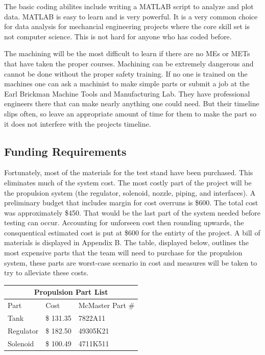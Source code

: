 \documentclass[conference]{IEEEtran} %
\begin{document}
The basic coding abilites include writing a MATLAB script to analyze and plot data. MATLAB is easy to learn and is very powerful. It is a very common choice for data analysis for mechancial engineering
projects where the core skill set is not computer science. This is not hard for anyone who has coded before.

The machining will be the most difficult to learn if there are no MEs or METs that have taken the proper courses. Machining can be extremely dangerous and cannot be done
without the proper safety training. If no one is trained on the machines one can ask a machinist to make simple parts or submit a job at the Earl Brickman Machine Tools and Manufacturing Lab.
They have professional engineers there that can make nearly anything one could need. But their timeline slips often, so leave an appropriate amount of time for them to make the part
so it does not interfere with the projects timeline.

\subsection{Funding Requirements}
Fortunately, most of the materials for the test stand have been purchased. This eliminates much of the system cost. The most costly part of the project
will be the propulsion system (the regulator, solenoid, nozzle, piping, and interfaces). A preliminary budget that includes margin for cost overruns is \$600.
The total cost was approximately \$450. That would be the last part of the system needed before testing can occur. Accounting for unforseen cost then rounding upwards,
the consquentical estimated cost is put at \$600 for the entirty of the project. A bill of materials is displayed in Appendix B. The table, displayed below, outlines
the most expensive parts that the team will need to purchase for the propulsion system, these parts are worst-case scenario in cost and measures will be taken to
try to alleviate these costs.

\centering
\begin{tabular}{ |p{2cm}|p{2cm}|p{2cm}| }
  \hline
  \multicolumn{3}{|c|}{Propulsion Part List} \\
  \hline
  Part & Cost & McMaster Part \# \\
  \hline
  Tank & \$ 131.35 & 7822A11 \\
  \hline
  Regulator & \$ 182.50 & 49305K21 \\
  \hline
  Solenoid & \$ 100.49 & 4711K511 \\
  \hline
\end{tabular}
\end{document}
